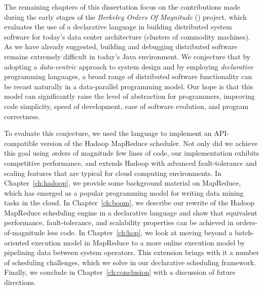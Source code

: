 The remaining chapters of this dissertation focus on the contributions made
during the early stages of the {\em Berkeley Orders Of Magnitude} (\BOOM)
project, which evaluates the use of a declarative language in building
distributed system software for today's data center architecture (clusters of
commodity machines).  As we have already suggested, building and debugging
distributed software remains extremely difficult in today's Java environment.
We conjecture that by adopting a \emph{data-centric} approach to system design
and by employing \emph{declarative} programming languages, a broad range of
distributed software functionality can be recast naturally in a data-parallel
programming model.  Our hope is that this model can significantly raise the
level of abstraction for programmers, improving code simplicity, speed of
development, ease of software evolution, and program correctness.

To evaluate this conjecture, we used the \OVERLOG language to implement an
API-compatible version of the Hadoop MapReduce scheduler.  Not only did we
achieve this goal using {\emph orders of magnitude} few lines of code, our
implementation exhibits competitive performance, and extends Hadoop with
advanced fault-tolerance and scaling features that are typical for cloud
computing environments.  In Chapter~\ref{ch:hadoop}, we provide some background
material on MapReduce, which has emerged as a popular programming model for
writing data mining tasks in the cloud.  In Chapter~\ref{ch:boom}, we describe
our rewrite of the Hadoop MapReduce scheduling engine in a declarative language
and show that equivalent performance, fault-tolerance, and scalability
properties can be achieved in orders-of-magnitude less code.  In
Chapter~\ref{ch:hop}, we look at moving beyond a batch-oriented execution model
in MapReduce to a more online execution model by pipelining data between system
operators.  This extension brings with it a number of scheduling challenges,
which we solve in our declarative scheduling framework.  Finally, we conclude
in Chapter~\ref{ch:conclusion} with a discussion of future directions.





